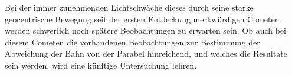 \par\indent Bei der immer zunehmenden Lichtschwäche dieses durch seine starke geocentrische
Bewegung seit der ersten Entdeckung merkwürdigen Cometen werden schwerlich noch
spätere Beobachtungen zu erwarten sein. Ob auch bei diesem Cometen die vorhandenen
Beobachtungen zur Bestimmung der Abweichung der Bahn von der Parabel hinreichend, und
welches die Resultate sein werden, wird eine künftige Untersuchung lehren.
